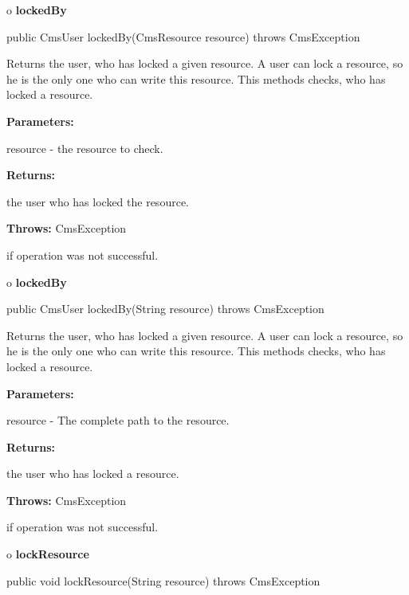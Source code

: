 o {\bf lockedBy} 

\begin{PRE}
 public CmsUser lockedBy(CmsResource resource) throws CmsException
\end{PRE}

\begin{description}
\htmlDD Returns the user, who has locked a given resource. \htmlBR
A user can lock a resource, so he is the only one who can write this resource.
This methods checks, who has locked a resource. 

\begin{description}
\item {\bf Parameters:}  

resource - the resource to check.  
\item {\bf Returns:}  

the user who has locked the resource.  
\item {\bf Throws:} CmsException  

if operation was not successful.  
\end{description}

\end{description}

o {\bf lockedBy} 

\begin{PRE}
 public CmsUser lockedBy(String resource) throws CmsException
\end{PRE}

\begin{description}
\htmlDD Returns the user, who has locked a given resource. \htmlBR
A user can lock a resource, so he is the only one who can write this resource.
This methods checks, who has locked a resource. 

\begin{description}
\item {\bf Parameters:}  

resource - The complete path to the resource.  
\item {\bf Returns:}  

the user who has locked a resource.  
\item {\bf Throws:} CmsException  

if operation was not successful.  
\end{description}

\end{description}

o {\bf lockResource} 

\begin{PRE}
 public void lockResource(String resource) throws CmsException
\end{PRE}

